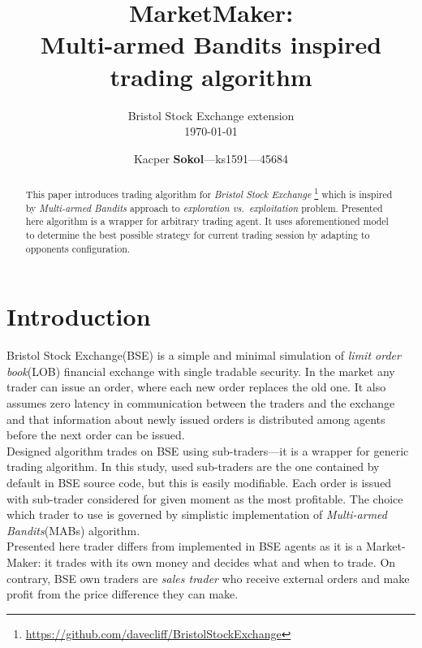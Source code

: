 \documentclass{llncs}
\begin{document}
\title{MarketMaker:\\Multi-armed Bandits inspired trading algorithm}
\subtitle{Bristol Stock Exchange extension\\[1em]\today}
\author{Kacper \textbf{Sokol}---ks1591---45684}
%
\maketitle
%

\begin{abstract}
This paper introduces trading algorithm for \emph{Bristol Stock Exchange}%
\footnote{\url{https://github.com/davecliff/BristolStockExchange}} %
which is inspired by \emph{Multi-armed Bandits} approach to \emph{exploration vs.\ exploitation} problem. Presented here algorithm is a wrapper for arbitrary trading agent. It uses aforementioned model to determine the best possible strategy for current trading session by adapting to opponents configuration.
\end{abstract}

\section{Introduction}
Bristol Stock Exchange(BSE) is a simple and minimal simulation of \emph{limit order book}(LOB) financial exchange with single tradable security. In the market any trader can issue an order, where each new order replaces the old one. It also assumes zero latency in communication between the traders and the exchange and that information about newly issued orders is distributed among agents before the next order can be issued.\\

Designed algorithm trades on BSE using sub-traders---it is a wrapper for generic trading algorithm. In this study, used sub-traders are the one contained by default in BSE source code, but this is easily modifiable. Each order is issued with sub-trader considered for given moment as the most profitable. The choice which trader to use is governed by simplistic implementation of \emph{Multi-armed Bandits}(MABs) algorithm.\\
Presented here trader differs from implemented in BSE agents as it is a Market-Maker: it trades with its own money and decides what and when to trade. On contrary, BSE own traders are \emph{sales trader} who receive external orders and make profit from the price difference they can make.\\
\end{document}
